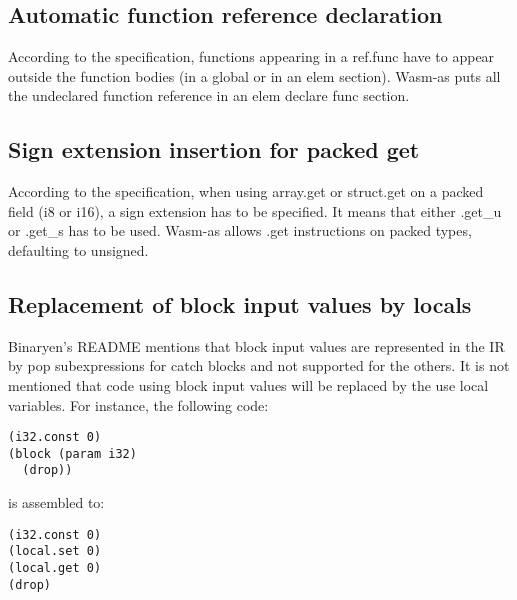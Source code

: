 \documentclass[a4paper,11pt]{article}
\begin{document}
\subsection{Automatic function reference declaration}
According to the specification, functions appearing in a \textsf{ref.func} have to
appear outside the function bodies (in a global or in an elem section). Wasm-as
puts all the undeclared function reference in an \textsf{elem declare func} section.

\subsection{Sign extension insertion for packed get}
According to the specification, when using \textsf{array.get} or
\textsf{struct.get} on a packed field (\textsf{i8} or \textsf{i16}), a sign
extension has to be specified. It means that either \textsf{.get\_u} or
\textsf{.get\_s} has to be used. Wasm-as allows \textsf{.get} instructions on
packed types, defaulting to unsigned.

\subsection{Replacement of block input values by locals}
Binaryen's README mentions that block input values are represented in the IR by
\textsf{pop} subexpressions for \textsf{catch} blocks and not supported for the
others. It is not mentioned that code using block input values will be replaced
by the use local variables. For instance, the following code:
\begin{lstlisting}
(i32.const 0)
(block (param i32)
  (drop))
\end{lstlisting}
is assembled to:
\begin{lstlisting}
(i32.const 0)
(local.set 0)
(local.get 0)
(drop)
\end{lstlisting}
\end{document}
